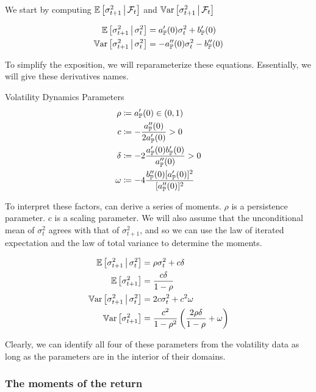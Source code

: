 \documentclass[11pt, letterpaper, twoside, final]{article}
\begin{document}
We start by computing $\operatorname{\mathbb{E}}\left[\sigma^2_{t+1} \,\middle\vert\, \mathcal{F}_t\right]$ and $\operatorname{\mathbb{V}ar}\left[\sigma^2_{t+1} \,\middle\vert\,
\mathcal{F}_t\right]$


\begin{align}
    \operatorname{\mathbb{E}}\left[\sigma^2_{t+1} \,\middle\vert\, \sigma^2_t \right]  &= a_{\mathbb{P}}'(0) \sigma^2_t  + b_{\mathbb{P}}'(0) \\
    \operatorname{\mathbb{V}ar}\left[\sigma^2_{t+1} \,\middle\vert\, \sigma^2_t \right]  &= -a_{\mathbb{P}}''(0) \sigma^2_t  - b_{\mathbb{P}}''(0) 
\end{align}

To simplify the exposition, we will reparameterize these equations. 
Essentially, we will give these derivatives names.

\begin{defn}{Volatility Dynamics Parameters}
    \begin{align}
        \rho &\coloneqq a_{\mathbb{P}}'(0) \in (0,1) \\
        c &\coloneqq - \frac{a_{\mathbb{P}}''(0)}{2 a_{\mathbb{P}}'(0)} > 0 \\
        \delta &\coloneqq -2 \frac{a_{\mathbb{P}}'(0) b_{\mathbb{P}}'(0)}{a_{\mathbb{P}}''(0)} > 0 \\
        \omega &\coloneqq -4 \frac{b_{\mathbb{P}}''(0) [a_{\mathbb{P}}'(0)]^2}{[a_{\mathbb{P}}''(0)]^2}
    \end{align}
\end{defn}

To interpret these factors, can derive a series of moments. 
$\rho$ is a persistence parameter.
$c$ is a scaling parameter.
We will also assume that the unconditional mean of $\sigma^2_t$ agrees with that of $\sigma^2_{t+1}$, and so we can use
the law of iterated expectation and the law of total variance to determine the moments.


\begin{align}
    \E\left[\sigma^2_{t+1} \mvert \sigma^2_t \right]  &= \rho \sigma^2_t  + c \delta\\
%
    \E\left[\sigma^2_{t+1}\right]  &= \frac{c \delta}{1 - \rho} \\
%
    \Var\left[\sigma^2_{t+1} \mvert \sigma^2_t \right]  &=  2 c \sigma^2_t  + c^2 \omega \\
%
    \Var\left[\sigma^2_{t+1} \right]  &=  \frac{c^2}{1- \rho^2} \left(\frac{2 \rho \delta}{1 - \rho}  + \omega
        \right) 
\end{align}

Clearly, we can identify all four of these parameters from the volatility data as long as the parameters are in
the interior of their domains.

\subsubsection{The moments of the return}
\end{document}
